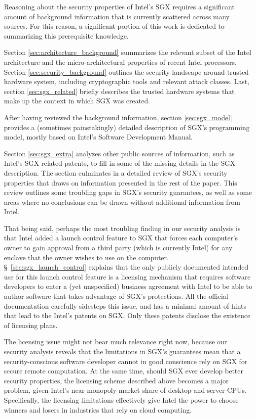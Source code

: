 \label{sec:sgx_intro_outline}

Reasoning about the security properties of Intel's SGX requires a significant
amount of background information that is currently scattered across many
sources. For this reason, a significant portion of this work is dedicated to
summarizing this prerequisite knowledge.

Section \ref{sec:architecture_background} summarizes the relevant subset of the
Intel architecture and the micro-architectural properties of recent Intel
processors. Section \ref{sec:security_background} outlines the security
landscape around trusted hardware system, including cryptographic tools and
relevant attack classes. Last, section \ref{sec:sgx_related} briefly describes
the trusted hardware systems that make up the context in which SGX was created.

After having reviewed the background information, section \ref{sec:sgx_model}
provides a (sometimes painstakingly) detailed description of SGX's programming
model, mostly based on Intel's Software Development Manual.

Section \ref{sec:sgx_extra} analyzes other public sources of information, such
as Intel's SGX-related patents, to fill in some of the missing details in the
SGX description. The section culminates in a detailed review of SGX's security
properties that draws on information presented in the rest of the paper. This
review outlines some troubling gaps in SGX's security guarantees, as well as
some areas where no conclusions can be drawn without additional information
from Intel.

That being said, perhaps the most troubling finding in our security analysis is
that Intel added a launch control feature to SGX that forces each computer's
owner to gain approval from a third party (which is currently Intel) for any
enclave that the owner wishes to use on the computer.
\S~\ref{sec:sgx_launch_control} explains that the only publicly documented
intended use for this launch control feature is a licensing mechanism that
requires software developers to enter a (yet unspecified) business agreement
with Intel to be able to author software that takes advantage of SGX's
protections. All the official documentation carefully sidesteps this issue, and
has a minimal amount of hints that lead to the Intel's patents on SGX. Only
these patents disclose the existence of licensing plans.

The licensing issue might not bear much relevance right now, because our
security analysis reveals that the limitations in SGX's guarantees mean that a
security-conscious software developer cannot in good conscience rely on SGX for
secure remote computation. At the same time, should SGX ever develop better
security properties, the licensing scheme described above becomes a major
problem, given Intel's near-monopoly market share of desktop and server CPUs.
Specifically, the licensing limitations effectively give Intel the power to
choose winners and losers in industries that rely on cloud computing.
